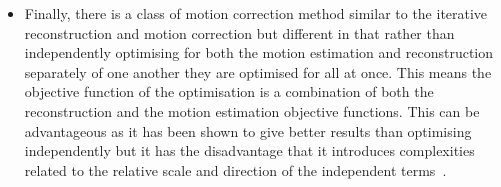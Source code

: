 \begin{itemize}
                \item Finally, there is a class of motion correction method similar to the iterative reconstruction and motion correction but different in that rather than independently optimising for both the motion estimation and reconstruction separately of one another they are optimised for all at once. This means the objective function of the optimisation is a combination of both the reconstruction and the motion estimation objective functions. This can be advantageous as it has been shown to give better results than optimising independently but it has the disadvantage that it introduces complexities related to the relative scale and direction of the independent terms~\parencite{Kalantari2016RespiratorySMEIR}.
            \end{itemize}
    
        
        
            
            
                            
                            
                
                            
                            
                
